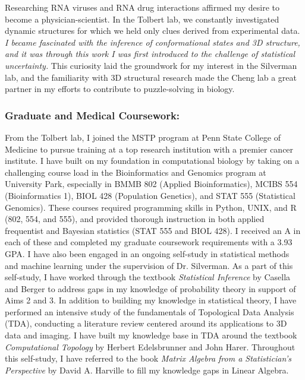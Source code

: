 \documentclass{NIHGrant}
\begin{document}
Researching RNA viruses and RNA drug interactions affirmed my desire to become a physician-scientist. In the Tolbert lab, we constantly investigated dynamic structures for which we held only clues derived from experimental data. \emph{I became fascinated with the inference of conformational states and 3D structure, and it was through this work I was first introduced to the challenge of statistical uncertainty.} This curiosity laid the groundwork for my interest in the Silverman lab, and the familiarity with 3D structural research made the Cheng lab a great partner in my efforts to contribute to puzzle-solving in biology.

\subsubsection*{Graduate and Medical Coursework:}
From the Tolbert lab, I joined the MSTP program at Penn State College of Medicine to pursue training at a top research institution with a premier cancer institute. I have built on my foundation in computational biology by taking on a challenging course load in the Bioinformatics and Genomics program at University Park, especially in BMMB 802 (Applied Bioinformatics), MCIBS 554 (Bioinformatics 1), BIOL 428 (Population Genetics), and STAT 555 (Statistical Genomics). These courses required programming skills in Python, UNIX, and R (802, 554, and 555), and provided thorough instruction in both applied frequentist and Bayesian statistics (STAT 555 and BIOL 428). I received an A in each of these and completed my graduate coursework requirements with a 3.93 GPA. I have also been engaged in an ongoing self-study in statistical methods and machine learning under the supervision of Dr. Silverman. As a part of this self-study, I have worked through the textbook \textit{Statistical Inference} by Casella and Berger to address gaps in my knowledge of probability theory in support of Aims 2 and 3. In addition to building my knowledge in statistical theory, I have performed an intensive study of the fundamentals of Topological Data Analysis (TDA), conducting a literature review centered around its applications to 3D data and imaging. I have built my knowledge base in TDA around the textbook \textit{Computational Topology} by Herbert Edelsbrunner and John Harer. Throughout this self-study, I have referred to the book \textit{Matrix Algebra from a Statistician's Perspective} by David A. Harville to fill my knowledge gaps in Linear Algebra.
\end{document}
